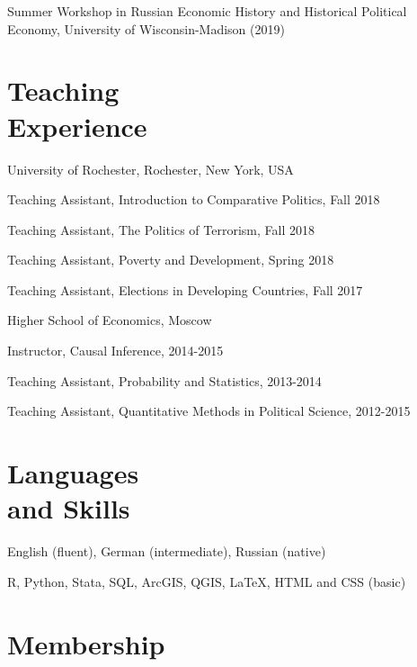 \documentclass[margin,line,12pt]{res}
\newenvironment{list1}{
  \begin{list}{\ding{113}}{%
      \setlength{\itemsep}{0in}
      \setlength{\parsep}{0in} \setlength{\parskip}{0in}
      \setlength{\topsep}{0in} \setlength{\partopsep}{0in}
      \setlength{\leftmargin}{0.17in}}}{\end{list}}
\begin{document}
\begin{resume}
 \vspace*{-4.5mm} 
 Summer Workshop in Russian Economic History and Historical Political Economy, University of Wisconsin-Madison (2019)
 

\section{\sc Teaching \\ Experience}

{University of Rochester}, Rochester, New York, USA\\
\vspace*{-.1in}
\begin{list1}
\item[] Teaching Assistant, Introduction to Comparative Politics, Fall 2018
\item[] Teaching Assistant, The Politics of Terrorism, Fall 2018
\item[] Teaching Assistant, Poverty and Development, Spring 2018
\item[] Teaching Assistant, Elections in Developing Countries, Fall 2017 
\end{list1}

\vspace{-3mm}
{Higher School of Economics, Moscow}\\
\vspace*{-.1in}
\begin{list1}
	\item[] Instructor, Causal Inference, 2014-2015
	\item[] Teaching Assistant, Probability and Statistics, 2013-2014
	\item[] Teaching Assistant, Quantitative Methods in Political Science, 2012-2015
\end{list1}

\section{\sc Languages \\ and Skills}
English (fluent), German (intermediate), Russian (native)
\vspace*{-4.5mm}

R, Python, Stata, SQL, ArcGIS, QGIS, \LaTeX , HTML and CSS (basic) 
\vspace*{-2.5mm}

\section{\sc Membership}


\end{resume}
\end{document}
